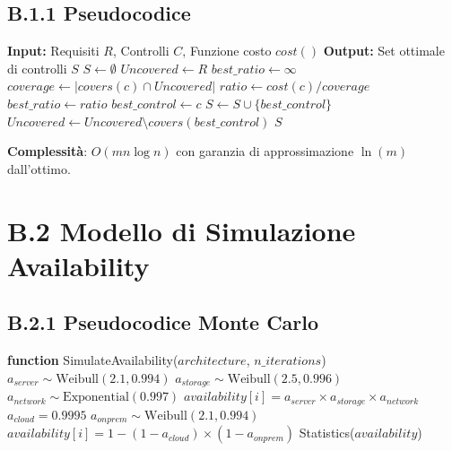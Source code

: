 \subsection{\texorpdfstring{\textbf{B.1.1 Pseudocodice}}{B.1.1 - Pseudocodice}}

\begin{algorithmic}[1]
\State \textbf{Input:} Requisiti $R$, Controlli $C$, Funzione costo $cost()$
\State \textbf{Output:} Set ottimale di controlli $S$
\State
\State $S \leftarrow \emptyset$
\State $Uncovered \leftarrow R$
    \State $best\_ratio \leftarrow \infty$
        \State $coverage \leftarrow |covers(c) \cap Uncovered|$
        \State $ratio \leftarrow cost(c) / coverage$
            \State $best\_ratio \leftarrow ratio$
            \State $best\_control \leftarrow c$
        \EndIf
    \EndFor
    \State $S \leftarrow S \cup \{best\_control\}$
    \State $Uncovered \leftarrow Uncovered \setminus covers(best\_control)$
\EndWhile
\State \Return $S$
\end{algorithmic}

\textbf{Complessità}: $O(mn \log n)$ con garanzia di approssimazione $\ln(m)$ dall'ottimo.

\section{\texorpdfstring{\textbf{B.2 Modello di Simulazione Availability}}{B.2 - Modello di Simulazione Availability}}

\subsection{\texorpdfstring{\textbf{B.2.1 Pseudocodice Monte Carlo}}{B.2.1 - Pseudocodice Monte Carlo}}

\begin{algorithmic}[1]
\State \textbf{function} SimulateAvailability($architecture$, $n\_iterations$)
        \State $a_{server} \sim \text{Weibull}(2.1, 0.994)$
        \State $a_{storage} \sim \text{Weibull}(2.5, 0.996)$
        \State $a_{network} \sim \text{Exponential}(0.997)$
        \State $availability[i] = a_{server} \times a_{storage} \times a_{network}$
        \State $a_{cloud} = 0.9995$ 
        \State $a_{onprem} \sim \text{Weibull}(2.1, 0.994)$
        \State $availability[i] = 1 - (1 - a_{cloud}) \times (1 - a_{onprem})$
    \EndIf
\EndFor
\State \Return Statistics($availability$)
\end{algorithmic}

